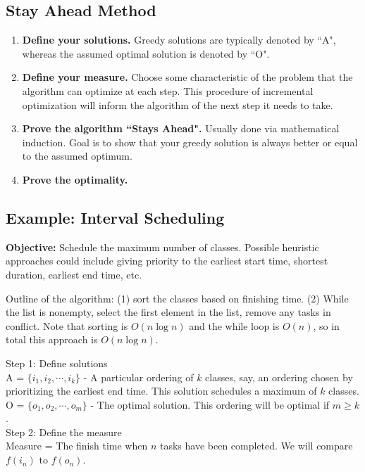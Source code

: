 \documentclass[11pt,letterpaper]{article}
\begin{document}
\subsection*{Stay Ahead Method}
\begin{enumerate}
\item \textbf{Define your solutions.} Greedy solutions are typically denoted by ``A", whereas the assumed optimal solution is denoted by ``O".
\item \textbf{Define your measure.} Choose some characteristic of the problem that the algorithm can optimize at each step. This procedure of incremental optimization will inform the algorithm of the next step it needs to take.
\item \textbf{Prove the algorithm ``Stays Ahead".} Usually done via mathematical induction. Goal is to show that your greedy solution is always better or equal to the assumed optimum.
\item \textbf{Prove the optimality.}
\end{enumerate}

\subsection*{Example: Interval Scheduling}
\textbf{Objective:} Schedule the maximum number of classes. Possible heuristic approaches could include giving priority to the earliest start time, shortest duration, earliest end time, etc.\\

\bigskip

Outline of the algorithm: (1) sort the classes based on finishing time. (2) While the list is nonempty, select the first element in the list, remove any tasks in conflict. Note that sorting is $O(n\log n)$ and the while loop is $O(n)$, so in total this approach is $O(n \log n)$.

Step 1: Define solutions \\
A = $\{i_1, i_2, \cdots, i_k \}$ - A particular ordering of $k$ classes, say, an ordering chosen by prioritizing the earliest end time. This solution schedules a maximum of $k$ classes.\\
O = $\{o_1, o_2, \cdots, o_m \}$ - The optimal solution. This ordering will be optimal if $m \geq k$. \\

Step 2: Define the measure \\
Measure = The finish time when $n$ tasks have been completed. We will compare $f(i_n)$ to $f(o_n)$.
\end{document}
